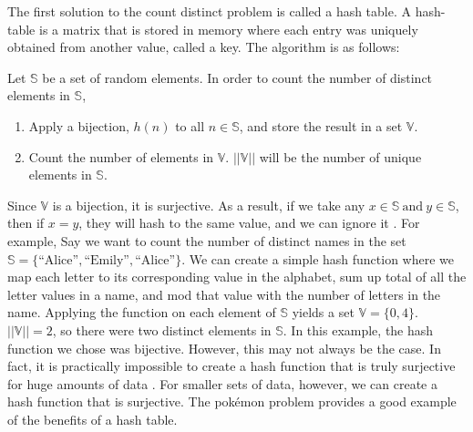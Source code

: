 \documentclass{article}
\begin{document}
\indent The first solution to the count distinct problem is called a hash table. 
A hash-table is a matrix that is stored in memory where each entry was uniquely obtained from another value, called a key. 
The algorithm is as follows:
\begin{center}
Let $\mathbb{S}$ be a set of random elements. In order to count the number of distinct elements in $\mathbb{S}$,
\begin{enumerate}
\item Apply a bijection, $h(n)$ to all $n\in\mathbb{S}$, and store the result in a set $\mathbb{V}$.
\item Count the number of elements in $\mathbb{V}$. $||\mathbb{V}||$ will be the number of unique elements in $\mathbb{S}$.
\end{enumerate}
\end{center}
Since $\mathbb{V}$ is a bijection, it is surjective. 
As a result, if we take any $x\in\mathbb{S}\ \text{and}\ y\in\mathbb{S}$, then if $x = y$, they will hash to the same value, and we can ignore it \cite[p. 6]{Maurer}. 
For example, Say we want to count the number of distinct names in the set $\mathbb{S} = \{\text{``Alice''},\text{``Emily''},\text{``Alice''}\}$. 
We can create a simple hash function where we map each letter to its corresponding value in the alphabet, sum up total of all the letter values in a name, and mod that value with the number of letters in the name. 
Applying the function on each element of $\mathbb{S}$ yields a set $\mathbb{V} = \{0,4\}$. $||\mathbb{V}|| = 2$, so there were two distinct elements in $\mathbb{S}$. In this example, the hash function we chose was bijective.
However, this may not always be the case. In fact, it is practically impossible to create a hash function that is truly surjective for huge amounts of data \cite[p. 6]{Maurer}. 
For smaller sets of data, however, we can create a hash function that is surjective. 
The pok\'emon problem provides a good example of the benefits of a hash table.\\
\end{document}
